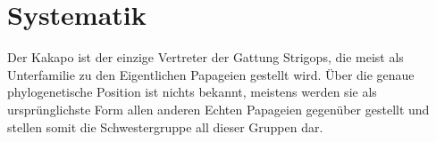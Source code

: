 \documentclass{scrartcl}
\begin{document}
\section*{Systematik}
\begin{multicols}{2}
Der Kakapo ist der einzige Vertreter der Gattung Strigops, die meist als Unterfamilie zu den Eigentlichen Papageien gestellt wird. Über die genaue phylogenetische Position ist nichts bekannt, meistens werden sie als ursprünglichste Form allen anderen Echten Papageien gegenüber gestellt und stellen somit die Schwestergruppe all dieser Gruppen dar.
\end{multicols}
\end{document}
